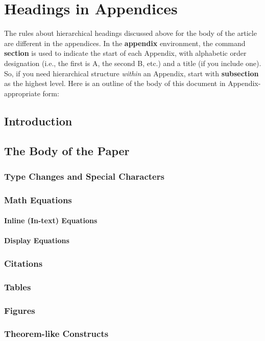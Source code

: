 \documentclass[twoside,letterpaper]{soups}
\begin{document}
\section{Headings in Appendices}
The rules about hierarchical headings discussed above for
the body of the article are different in the appendices.
In the \textbf{appendix} environment, the command
\textbf{section} is used to
indicate the start of each Appendix, with alphabetic order
designation (i.e., the first is A, the second B, etc.) and
a title (if you include one).  So, if you need
hierarchical structure
\textit{within} an Appendix, start with \textbf{subsection} as the
highest level. Here is an outline of the body of this
document in Appendix-appropriate form:
\subsection{Introduction}
\subsection{The Body of the Paper}
\subsubsection{Type Changes and  Special Characters}
\subsubsection{Math Equations}
\paragraph{Inline (In-text) Equations}
\paragraph{Display Equations}
\subsubsection{Citations}
\subsubsection{Tables}
\subsubsection{Figures}
\subsubsection{Theorem-like Constructs}
\end{document}
